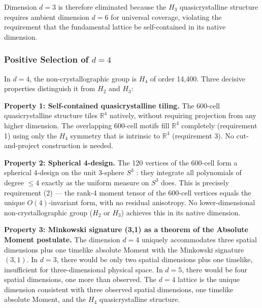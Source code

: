 \documentclass[11pt,letterpaper]{article}
\begin{document}
Dimension $d = 3$ is therefore eliminated because the $H_3$ 
quasicrystalline structure requires ambient dimension $d = 6$ for 
universal coverage, violating the requirement that the fundamental 
lattice be self-contained in its native dimension.

\subsubsection{Positive Selection of $d = 4$}

In $d = 4$, the non-crystallographic group is $H_4$ of order 14,400. 
Three decisive properties distinguish it from $H_2$ and $H_3$:

\textbf{Property 1: Self-contained quasicrystalline tiling.}
The 600-cell quasicrystalline structure tiles $\mathbb{R}^4$ 
natively, without requiring projection from any higher dimension. 
The overlapping 600-cell motifs fill $\mathbb{R}^4$ completely 
(requirement 1) using only the $H_4$ symmetry that is intrinsic 
to $\mathbb{R}^4$ (requirement 3). No cut-and-project construction 
is needed.

\textbf{Property 2: Spherical 4-design.}
The 120 vertices of the 600-cell form a spherical 4-design on the 
unit 3-sphere $S^3$ \cite{bannai1979}: they integrate all 
polynomials of degree $\leq 4$ exactly as the uniform measure on 
$S^3$ does. This is precisely requirement (2) — the rank-4 moment 
tensor of the 600-cell vertices equals the unique $O(4)$-invariant 
form, with no residual anisotropy. No lower-dimensional 
non-crystallographic group ($H_2$ or $H_3$) achieves this in its 
native dimension.

\textbf{Property 3: Minkowski signature (3,1) as a theorem of the 
Absolute Moment postulate.}
The dimension $d = 4$ uniquely accommodates three spatial dimensions 
plus one timelike absolute Moment with the Minkowski signature 
$(3,1)$. In $d = 3$, there would be only two spatial dimensions 
plus one timelike, insufficient for three-dimensional physical space. 
In $d = 5$, there would be four spatial dimensions, one more than 
observed. The $d = 4$ lattice is the unique dimension consistent 
with three observed spatial dimensions, one timelike absolute Moment, 
and the $H_4$ quasicrystalline structure.
\end{document}
